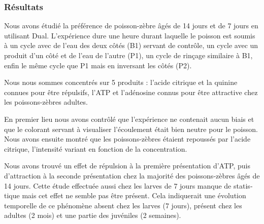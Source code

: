 \begin{otherlanguage}{french}
\subsubsection*{Résultats}
Nous avons étudié la préférence de poisson-zèbre âgés de 14 jours et de 7 jours en utilisant Dual. L'expérience dure une heure durant laquelle le poisson est soumis à un cycle avec de l'eau des deux côtés (B1) servant de contrôle, un cycle avec un produit d'un côté et de l'eau de l'autre (P1), un cycle de rinçage similaire à B1, enfin le même cycle que P1 mais en inversant les côtés (P2).

Nous nous sommes concentrés sur 5 produits : l'acide citrique et la quinine connues pour être répulsifs, l'ATP et l'adénosine connus pour être attractive chez les poissons-zèbres adultes.

En premier lieu nous avons contrôlé que l'expérience ne contenait aucun biais et que le colorant servant à visualiser l'écoulement était bien neutre pour le poisson. Nous avons ensuite montré que les poissons-zèbres étaient repoussés par l'acide citrique, l'intensité variant en fonction de la concentration.

Nous avons trouvé un effet de répulsion à la première présentation d'ATP, puis d'attraction à la seconde présentation chez la majorité des poissons-zèbres âgés de 14 jours. Cette étude effectuée aussi chez les larves de 7 jours manque de statistique mais cet effet ne semble pas être présent. Cela indiquerait une évolution temporelle de ce phénomène absent chez les larves (7 jours), présent chez les adultes (2 mois) et une partie des juvéniles (2 semaines).
\end{otherlanguage}
